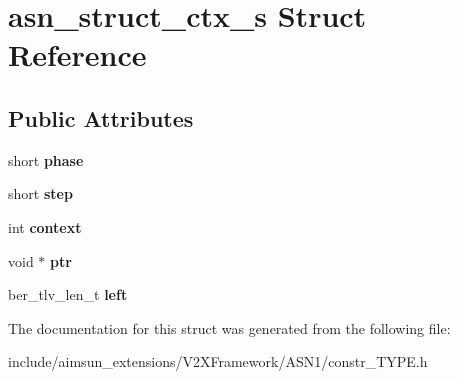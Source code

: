 \hypertarget{structasn__struct__ctx__s}{}\section{asn\+\_\+struct\+\_\+ctx\+\_\+s Struct Reference}
\label{structasn__struct__ctx__s}
\subsection*{Public Attributes}
\begin{DoxyCompactItemize}
\item 
short {\bfseries phase}\hypertarget{structasn__struct__ctx__s_a34c3cbadc60f33eddb20095ab397a9c4}{}\label{structasn__struct__ctx__s_a34c3cbadc60f33eddb20095ab397a9c4}

\item 
short {\bfseries step}\hypertarget{structasn__struct__ctx__s_ac1bd97e26ed31920941bcb44edca5514}{}\label{structasn__struct__ctx__s_ac1bd97e26ed31920941bcb44edca5514}

\item 
int {\bfseries context}\hypertarget{structasn__struct__ctx__s_a969440b1f76b63cc5f739df9ec127f5c}{}\label{structasn__struct__ctx__s_a969440b1f76b63cc5f739df9ec127f5c}

\item 
void $\ast$ {\bfseries ptr}\hypertarget{structasn__struct__ctx__s_a85a8df91ee53fb5c2d9232a62d792f93}{}\label{structasn__struct__ctx__s_a85a8df91ee53fb5c2d9232a62d792f93}

\item 
ber\+\_\+tlv\+\_\+len\+\_\+t {\bfseries left}\hypertarget{structasn__struct__ctx__s_adfba2796328af7c6054fadaf22b4ed6b}{}\label{structasn__struct__ctx__s_adfba2796328af7c6054fadaf22b4ed6b}

\end{DoxyCompactItemize}


The documentation for this struct was generated from the following file\+:\begin{DoxyCompactItemize}
\item 
include/aimsun\+\_\+extensions/\+V2\+X\+Framework/\+A\+S\+N1/constr\+\_\+\+T\+Y\+P\+E.\+h\end{DoxyCompactItemize}
